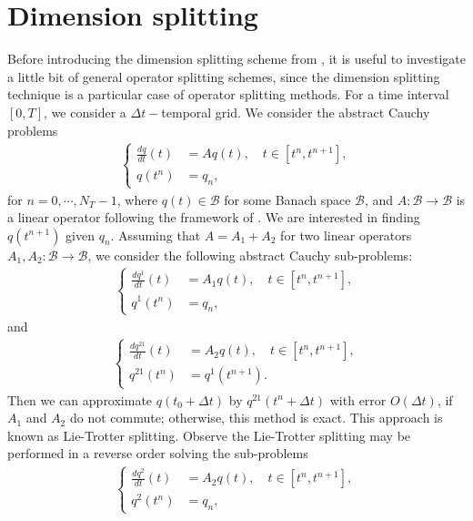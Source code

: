 \section{Dimension splitting}
\label{sec-dsplit}
Before introducing the dimension splitting scheme from \citet{lin:1996}, it is useful to 
investigate a little bit of general operator splitting schemes, since the dimension splitting technique
is a particular case of operator splitting methods.
For a time interval $[0,T]$, we consider a $\Delta t-$temporal grid.
We consider the abstract Cauchy problems
\begin{align*}
	\begin{cases}
		\frac{dq}{dt}(t) &= Aq(t), \quad t \in [t^n,t^{n+1}],\\
		q(t^n) &= q_n,
	\end{cases}
\end{align*}
for $n=0,\cdots, N_T-1$, where $q(t) \in \mathcal{B}$ for some Banach space $\mathcal{B}$, and $A:\mathcal{B} \to \mathcal{B}$ is a linear operator
following the framework of \citet[Chapter~3]{richtmyer:1968}.
We are interested in finding $q(t^{n+1})$ given $q_n$.
Assuming that $A = A_1 + A_2$ for two linear operators $A_1, A_2:\mathcal{B} \to \mathcal{B}$, we consider the following abstract Cauchy sub-problems:
\begin{align*}
	\begin{cases}
		\frac{dq^1}{dt}(t) &= A_1q(t), \quad t \in [t^{n},t^{n+1}],\\
		q^{1}(t^n) &= q_n,
	\end{cases}
\end{align*}
and
\begin{align*}
	\begin{cases}
		\frac{dq^{21}}{dt}(t) &= A_2q(t), \quad t \in [t^n,t^{n+1}],\\
		q^{21}(t^n) &= q^1(t^{n+1}).
	\end{cases}
\end{align*}
Then we can approximate $q(t_0 + \Delta t)$ by $q^{21}(t^n + \Delta t)$ with error $O(\Delta t)$, if $A_1$ and $A_2$
do not commute; otherwise, this method is exact.
This approach is known as Lie-Trotter splitting. Observe the  Lie-Trotter splitting may be performed
in a reverse order solving the sub-problems
\begin{align*}
	\begin{cases}
		\frac{dq^2}{dt}(t) &= A_2q(t), \quad t \in [t^n,t^{n+1}],\\
		q^{2}(t^n) &= q_n,
	\end{cases}
\end{align*}
